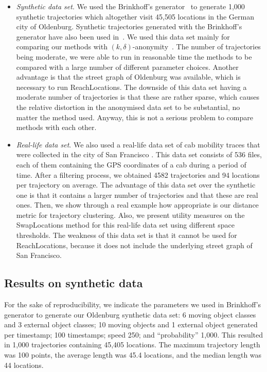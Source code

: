 \begin{itemize}
\item {\em Synthetic data set}.
We used the Brinkhoff's generator~\cite{brinkhoff03} to generate
1,000 synthetic trajectories which altogether visit
45,505 locations in the German city of
Oldenburg.
Synthetic trajectories generated with the Brinkhoff's generator have also
been used in~\cite{abul08,nergiz08,nergiz09,yarovoy09}.
We used this data set mainly for comparing
our methods with $(k,\delta)$-anonymity~\cite{abul08}.
The number of trajectories
being moderate, we were able to run
in reasonable time the methods to be compared with a large
number of different parameter choices. Another advantage
is that the street graph of Oldenburg was available, which
is necessary to run ReachLocations. The downside of this data set having
a moderate number of trajectories is that these are rather sparse,
which causes the relative distortion in the anonymised data set to
be substantial, no matter the method used. Anyway, this is not
a serious problem to compare methods with each other.
\item {\em Real-life data set}.
We also used a real-life data set of cab mobility traces that were
collected in the city of San Francisco \cite{comsnets09piorkowski}.
This data set consists of 536 files, each of them containing
the GPS coordinates of a cab during a period of time.
After a filtering process, we obtained 4582 trajectories and 94
locations per trajectory on average. The advantage
of this data set over the synthetic one is that it
contains a larger number of trajectories and that these are real ones.
Then, we show through a real example how appropriate is our distance metric for trajectory clustering. Also, we present
utility measures on the SwapLocations method for this real-life data set
using different space thresholds. The weakness of this data set
is that it cannot be used for ReachLocations, because it does
not include the underlying street graph of San Francisco.
\end{itemize}


\subsection{Results on synthetic data}

For the sake of reproducibility, we indicate
the parameters we used in Brinkhoff's generator
to generate our Oldenburg synthetic data set: 6
moving object classes and 3 external object classes; 10 moving objects and
1 external object generated per timestamp; 100 timestamps; speed 250;
and ``probability'' 1,000. This resulted in 1,000 trajectories containing
45,405 locations. The maximum trajectory length was 100 points, the
average length was 45.4 locations, and the median length was 44 locations.

